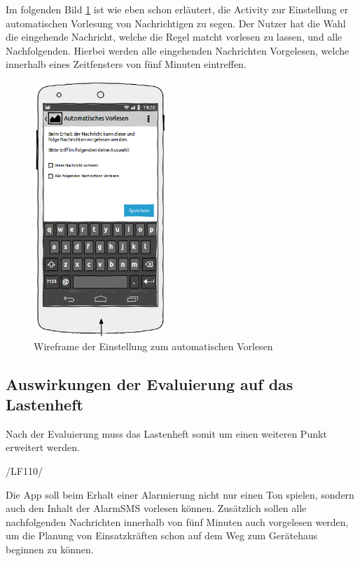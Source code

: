 Im folgenden Bild \ref{Wireframe Vorlesen} ist wie eben schon erl\"autert, die Activity zur Einstellung er automatischen Vorlesung von Nachrichtigen zu segen.
Der Nutzer hat die Wahl die eingehende Nachricht, welche die Regel matcht vorlesen zu lassen, und alle Nachfolgenden. Hierbei werden alle eingehenden Nachrichten Vorgelesen, welche innerhalb eines Zeitfensters von f\"unf Minuten eintreffen.
\begin{figure}[!ht]
\centering
\includegraphics[width=5cm]{Bilder/WireFrameVorlesen.png}
\caption{Wireframe der Einstellung zum automatischen Vorlesen}
\label{Wireframe Vorlesen}
\centering
\end{figure}

\subsection{Auswirkungen der Evaluierung auf das Lastenheft}
Nach der Evaluierung muss das Lastenheft somit um einen weiteren Punkt erweitert werden.

\begin{minipage}{3cm}
/LF110/
\end{minipage}
\begin{minipage}{12,2cm}
Die App soll beim Erhalt einer Alarmierung nicht nur einen Ton spielen, sondern auch den Inhalt der AlarmSMS vorlesen k\"onnen. Zus\"atzlich sollen alle nachfolgenden Nachrichten innerhalb von f\"unf Minuten auch vorgelesen werden, um die Planung von Einsatzkr\"aften schon auf dem Weg zum Ger\"atehaus beginnen zu k\"onnen.\\
\end{minipage}
